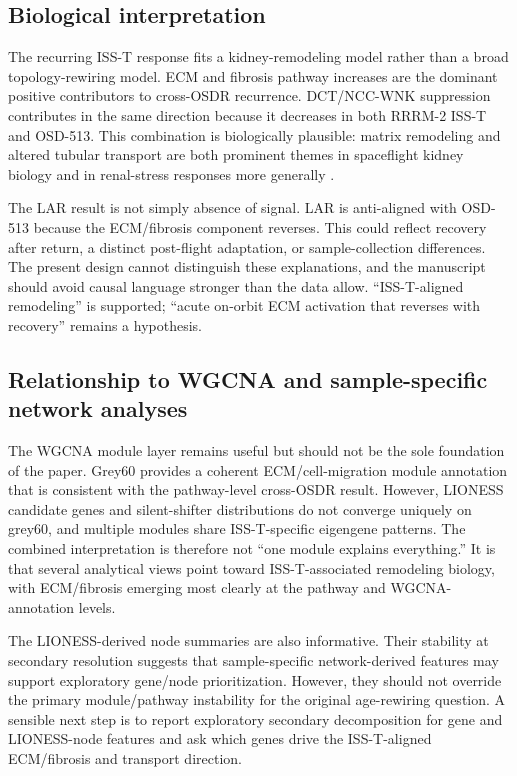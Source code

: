 \documentclass[11pt]{article}
\begin{document}
\subsection{Biological interpretation}

The recurring ISS-T response fits a kidney-remodeling model rather than a broad topology-rewiring model. ECM and fibrosis pathway increases are the dominant positive contributors to cross-OSDR recurrence. DCT/NCC-WNK suppression contributes in the same direction because it decreases in both RRRM-2 ISS-T and OSD-513. This combination is biologically plausible: matrix remodeling and altered tubular transport are both prominent themes in spaceflight kidney biology and in renal-stress responses more generally \citep{finch2025strain,siew2024cosmic}.

The LAR result is not simply absence of signal. LAR is anti-aligned with OSD-513 because the ECM/fibrosis component reverses. This could reflect recovery after return, a distinct post-flight adaptation, or sample-collection differences. The present design cannot distinguish these explanations, and the manuscript should avoid causal language stronger than the data allow. ``ISS-T-aligned remodeling'' is supported; ``acute on-orbit ECM activation that reverses with recovery'' remains a hypothesis.

\subsection{Relationship to WGCNA and sample-specific network analyses}

The WGCNA module layer remains useful but should not be the sole foundation of the paper. Grey60 provides a coherent ECM/cell-migration module annotation that is consistent with the pathway-level cross-OSDR result. However, LIONESS candidate genes and silent-shifter distributions do not converge uniquely on grey60, and multiple modules share ISS-T-specific eigengene patterns. The combined interpretation is therefore not ``one module explains everything.'' It is that several analytical views point toward ISS-T-associated remodeling biology, with ECM/fibrosis emerging most clearly at the pathway and WGCNA-annotation levels.

The LIONESS-derived node summaries are also informative. Their stability at secondary resolution suggests that sample-specific network-derived features may support exploratory gene/node prioritization. However, they should not override the primary module/pathway instability for the original age-rewiring question. A sensible next step is to report exploratory secondary decomposition for gene and LIONESS-node features and ask which genes drive the ISS-T-aligned ECM/fibrosis and transport direction.
\end{document}
